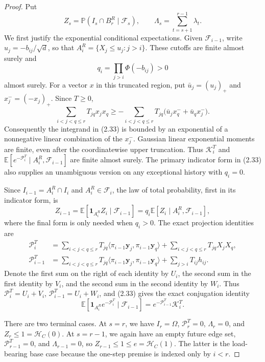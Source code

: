 \begin{proof}
Put
\[
 Z_s=\mathbb P(I_s\cap B^R_r\mid\mathcal F_s),\qquad
 \Lambda_s=\sum_{t=s+1}^{r-1}\lambda_t.
\]
We first justify the exponential conditional expectations.  Given
\(\mathcal F_{i-1}\), write \(u_j=-b_{ij}/\sqrt d\), so that
\(A_i^R=\{X_j\le u_j:j>i\}\).  These cutoffs are finite almost surely and
\[
 q_i=\prod_{j>i}\Phi(-b_{ij})>0
\]
almost surely.  For a vector \(x\) in this truncated region, put
\(\bar u_j=(u_j)_+\) and \(x_j^-=(-x_j)_+\).  Since \(T\ge0\),
\[
 \sum_{i<j<q\le r}T_{jq}x_jx_q
 \ge-\sum_{i<j<q\le r}T_{jq}
       \bigl(\bar u_jx_q^-+\bar u_qx_j^-\bigr).
\]
Consequently the integrand in (2.33) is bounded by an exponential of a
nonnegative linear combination of the \(x_j^-\).  Gaussian linear exponential
moments are finite, even after the coordinatewise upper truncation.  Thus
\(\mathcal K_i^T\) and
\(\mathbb E[e^{-\mathcal P_i^T}\mid A_i^R,\mathcal F_{i-1}]\) are finite
almost surely.  The primary indicator form in (2.33) also supplies an
unambiguous version on any exceptional history with \(q_i=0\).

Since \(I_{i-1}=A_i^R\cap I_i\) and \(A_i^R\in\mathcal F_i\), the law of
total probability, first in its indicator form, is
\[
 Z_{i-1}
 =\mathbb E[\mathbf1_{A_i^R}Z_i\mid\mathcal F_{i-1}]
 =q_i\mathbb E[Z_i\mid A_i^R,\mathcal F_{i-1}],
\tag{2.39}
\]
where the final form is only needed when \(q_i>0\).  The exact projection
identities are
\[
\begin{aligned}
 \mathcal P_i^T
 &=\sum_{i<j<q\le r}T_{jq}
 \langle\pi_{i-1}\boldsymbol y_j,\pi_{i-1}\boldsymbol y_q\rangle
   +\sum_{i<j<q\le r}T_{jq}X_jX_q,\\
 \mathcal P_{i-1}^T
 &=\sum_{i<j<q\le r}T_{jq}
 \langle\pi_{i-1}\boldsymbol y_j,\pi_{i-1}\boldsymbol y_q\rangle
   +\sum_{j>i}T_{ij}h_{ij}.
\end{aligned}
\tag{2.40}
\]
Denote the first sum on the right of each identity by \(U_i\), the second sum
in the first identity by \(V_i\), and the second sum in the second identity by
\(W_i\).  Thus \(\mathcal P_i^T=U_i+V_i\),
\(\mathcal P_{i-1}^T=U_i+W_i\), and (2.33) gives the exact conjugation identity
\[
 \mathbb E[\mathbf1_{A_i^R}e^{-\mathcal P_i^T}
            \mid\mathcal F_{i-1}]
 =e^{-\mathcal P_{i-1}^T}\mathcal K_i^T.
\]

There are two terminal cases.  At \(s=r\), we have \(I_r=\Omega\),
\(\mathcal P_r^T=0\), \(\Lambda_r=0\), and
\(Z_r\le1=\mathcal H_C(0)\).  At \(s=r-1\), we again have an empty future
edge set, \(\mathcal P_{r-1}^T=0\), and \(\Lambda_{r-1}=0\), so
\(Z_{r-1}\le1\le e=\mathcal H_C(1)\).  The latter is the load-bearing base
case because the one-step premise is indexed only by \(i<r\).


\end{proof}
